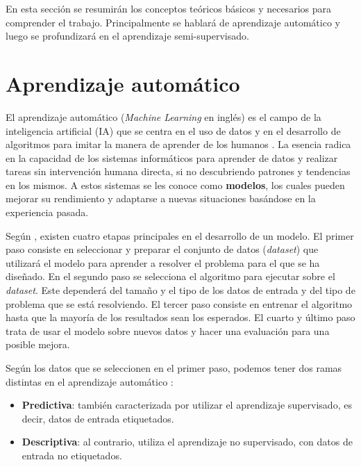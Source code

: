 
En esta sección se resumirán los conceptos teóricos básicos y necesarios para comprender el trabajo. Principalmente se hablará de aprendizaje automático y luego se profundizará en el aprendizaje semi-supervisado.

\section{Aprendizaje automático}
El aprendizaje automático (\textit{Machine Learning} en inglés) es el campo de la inteligencia artificial (IA) que se centra en el uso de datos y en el desarrollo de algoritmos para imitar la manera de aprender de los humanos \cite{ML:ibm}. La esencia radica en la capacidad de los sistemas informáticos para aprender de datos y realizar tareas sin intervención humana directa, si no descubriendo patrones y tendencias en los mismos. A estos sistemas se les conoce como \textbf{modelos}, los cuales pueden mejorar su rendimiento y adaptarse a nuevas situaciones basándose en la experiencia pasada.

Según \cite{ML:DataScientest}, existen cuatro etapas principales en el desarrollo de un modelo. El primer paso consiste en seleccionar y preparar el conjunto de datos (\textit{dataset}) que utilizará el modelo para aprender a resolver el problema para el que se ha diseñado. En el segundo paso se selecciona el algoritmo para ejecutar sobre el \textit{dataset}. Este dependerá del tamaño y el tipo de los datos de entrada y del tipo de problema que se está resolviendo. El tercer paso consiste en entrenar el algoritmo hasta que la mayoría de los resultados sean los esperados. El cuarto y último paso trata de usar el modelo sobre nuevos datos y hacer una evaluación para una posible mejora.

Según los datos que se seleccionen en el primer paso, podemos tener dos ramas distintas en el aprendizaje automático \cite{ML:SisInt}:
\begin{itemize}
	\item \textbf{Predictiva}: también caracterizada por utilizar el aprendizaje supervisado, es decir, datos de entrada etiquetados.
	\item \textbf{Descriptiva}: al contrario, utiliza el aprendizaje no supervisado, con datos de entrada no etiquetados.
\end{itemize}

 
